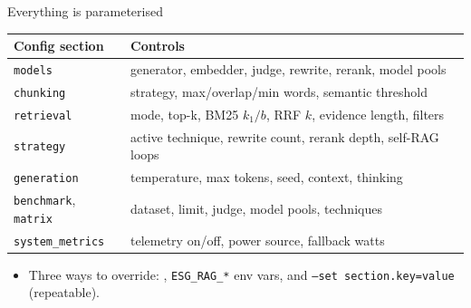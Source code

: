 \documentclass[aspectratio=169]{beamer}
\begin{document}
\begin{frame}{Everything is parameterised}
  \small
  \begin{table}
    \centering
    \begin{tabular}{p{}p{}}
    \toprule
    Config section & Controls \\
    \midrule
    \texttt{models} & generator, embedder, judge, rewrite, rerank, model pools \\
    \texttt{chunking} & strategy, max/overlap/min words, semantic threshold \\
    \texttt{retrieval} & mode, top-k, BM25 $k_1/b$, RRF $k$, evidence length, filters \\
    \texttt{strategy} & active technique, rewrite count, rerank depth, self-RAG loops \\
    \texttt{generation} & temperature, max tokens, seed, context, thinking \\
    \texttt{benchmark}, \texttt{matrix} & dataset, limit, judge, model pools, techniques \\
    \texttt{system\_metrics} & telemetry on/off, power source, fallback watts \\
    \bottomrule
    \end{tabular}
  \end{table}
  \begin{itemize}
    \item Three ways to override: , \texttt{ESG\_RAG\_*} env vars, and \texttt{--set section.key=value} (repeatable).
  \end{itemize}
\end{frame}
\end{document}
